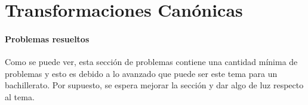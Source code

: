 \documentclass[/home/hernan-barquero/Documents/Apuntes_mecanica_teorica/main.tex]{subfiles}
\begin{document}
    \part{Transformaciones Canónicas}
    


    \subsection{Problemas resueltos}
    Como se puede ver, esta sección de problemas contiene una cantidad mínima de problemas y esto es debido a lo avanzado que puede ser este tema para un bachillerato. Por supuesto, se espera mejorar la sección y dar algo de luz respecto al tema.
    
\end{document}
